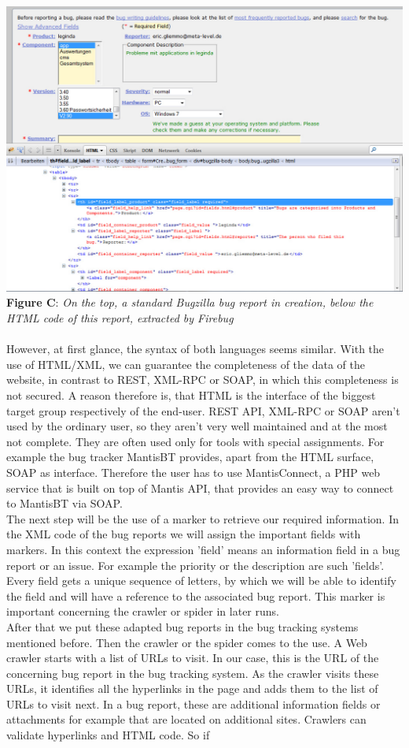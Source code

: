 \\\includegraphics[width=1.0\textwidth]{Screenshot_bugzilla_html2.jpg}  \\\textbf{Figure C}: \textit{On the top, a standard Bugzilla bug report in creation, below the HTML code of this report, extracted by Firebug}  \\ \\ However, at first glance, the syntax of both languages seems similar. With the use of HTML/XML, we can guarantee the completeness of the data of the website, in contrast to REST, XML-RPC or SOAP, in which this completeness is not secured. A reason therefore is, that HTML is the interface of the biggest target group respectively of the end-user. REST API, XML-RPC or SOAP aren't used by the ordinary user, so they aren't very well maintained and at the most not complete. They are often used only for tools with special assignments. For example the bug tracker MantisBT provides, apart from the HTML surface, SOAP as interface. Therefore the user has to use MantisConnect, a PHP web service that is built on top of Mantis API, that provides an easy way to connect to MantisBT via SOAP.   \\ The next step will be the use of a marker to retrieve our required information. In the XML code of the bug reports we will assign the important fields with markers. In this context the expression 'field' means an information field in a bug report or an issue. For example the priority or the description are such 'fields'. Every field gets a unique sequence of letters, by which we will be able to identify the field and will have a reference to the associated bug report. This marker is important concerning the crawler or spider in later runs. \\After that we put these adapted bug reports in the bug tracking systems mentioned before. Then the crawler or the spider comes to the use. A Web crawler starts with a list of URLs to visit. In our case, this is the URL of the concerning bug report in the bug tracking system. As the crawler visits these URLs, it identifies all the hyperlinks in the page and adds them to the list of URLs to visit next. In a bug report, these are additional information fields or attachments for example that are located on additional sites. Crawlers can validate hyperlinks and HTML code. So if 